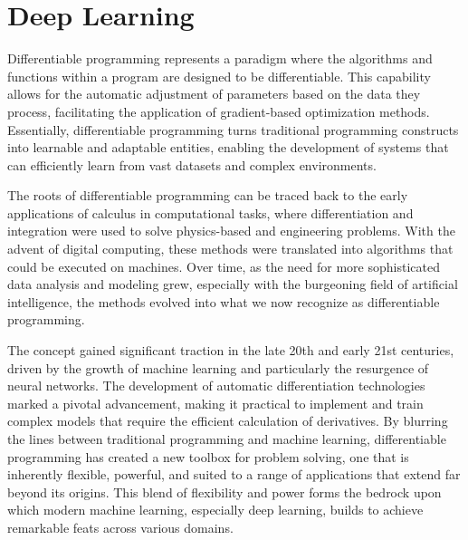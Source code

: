\chapter{Deep Learning}

Differentiable programming  represents a
paradigm where the algorithms and functions within a program are designed to be
differentiable. This capability allows for the automatic adjustment of
parameters based on the data they process, facilitating the application of
gradient-based optimization methods. Essentially, differentiable programming
turns traditional programming constructs into learnable and adaptable entities,
enabling the development of systems that can efficiently learn from vast
datasets and complex environments.

The roots of differentiable programming can be traced back to the early
applications of calculus in computational tasks, where differentiation and
integration were used to solve physics-based and engineering problems. With the
advent of digital computing, these methods were translated into algorithms that
could be executed on machines. Over time, as the need for more sophisticated
data analysis and modeling grew, especially with the burgeoning field of
artificial intelligence, the methods evolved into what we now recognize as
differentiable programming.

The concept gained significant traction in the late 20th and early 21st
centuries, driven by the growth of machine learning and particularly the
resurgence of neural networks. The development of automatic differentiation
technologies marked a pivotal advancement, making it practical to implement and
train complex models that require the efficient calculation of derivatives. By
blurring the lines between traditional programming and machine learning,
differentiable programming has created a new toolbox for problem solving, one
that is inherently flexible, powerful, and suited to a range of applications
that extend far beyond its origins. This blend of flexibility and power forms
the bedrock upon which modern machine learning, especially deep
learning, builds to achieve remarkable feats across
various domains.

